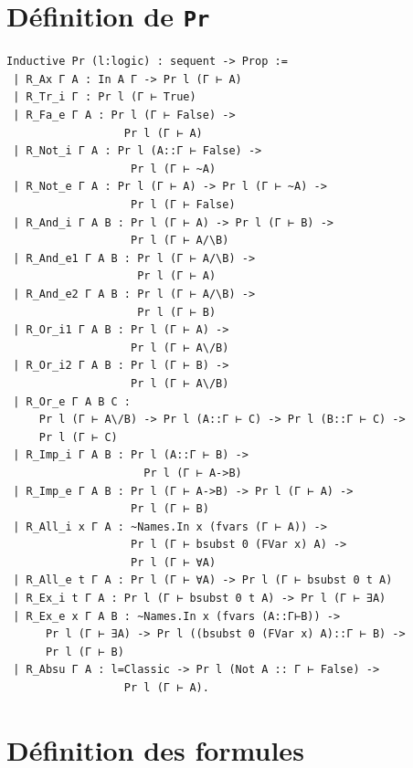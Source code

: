 \documentclass[a4paper]{article}
\theoremstyle{remark}
\theoremstyle{remark}
\theoremstyle{remark}
\theoremstyle{definition}
\theoremstyle{definition}
\theoremstyle{definition}
\begin{document}
\newpage



\nocite{*}


\appendix
\newpage



\section{Définition de \texttt{Pr}} \label{pr}

\begin{verbatim}
Inductive Pr (l:logic) : sequent -> Prop :=
 | R_Ax Γ A : In A Γ -> Pr l (Γ ⊢ A)
 | R_Tr_i Γ : Pr l (Γ ⊢ True)
 | R_Fa_e Γ A : Pr l (Γ ⊢ False) ->
                  Pr l (Γ ⊢ A)
 | R_Not_i Γ A : Pr l (A::Γ ⊢ False) ->
                   Pr l (Γ ⊢ ~A)
 | R_Not_e Γ A : Pr l (Γ ⊢ A) -> Pr l (Γ ⊢ ~A) ->
                   Pr l (Γ ⊢ False)
 | R_And_i Γ A B : Pr l (Γ ⊢ A) -> Pr l (Γ ⊢ B) ->
                   Pr l (Γ ⊢ A/\B)
 | R_And_e1 Γ A B : Pr l (Γ ⊢ A/\B) ->
                    Pr l (Γ ⊢ A)
 | R_And_e2 Γ A B : Pr l (Γ ⊢ A/\B) ->
                    Pr l (Γ ⊢ B)
 | R_Or_i1 Γ A B : Pr l (Γ ⊢ A) ->
                   Pr l (Γ ⊢ A\/B)
 | R_Or_i2 Γ A B : Pr l (Γ ⊢ B) ->
                   Pr l (Γ ⊢ A\/B)
 | R_Or_e Γ A B C :
     Pr l (Γ ⊢ A\/B) -> Pr l (A::Γ ⊢ C) -> Pr l (B::Γ ⊢ C) ->
     Pr l (Γ ⊢ C)
 | R_Imp_i Γ A B : Pr l (A::Γ ⊢ B) ->
                     Pr l (Γ ⊢ A->B)
 | R_Imp_e Γ A B : Pr l (Γ ⊢ A->B) -> Pr l (Γ ⊢ A) ->
                   Pr l (Γ ⊢ B)
 | R_All_i x Γ A : ~Names.In x (fvars (Γ ⊢ A)) ->
                   Pr l (Γ ⊢ bsubst 0 (FVar x) A) ->
                   Pr l (Γ ⊢ ∀A)
 | R_All_e t Γ A : Pr l (Γ ⊢ ∀A) -> Pr l (Γ ⊢ bsubst 0 t A)
 | R_Ex_i t Γ A : Pr l (Γ ⊢ bsubst 0 t A) -> Pr l (Γ ⊢ ∃A)
 | R_Ex_e x Γ A B : ~Names.In x (fvars (A::Γ⊢B)) ->
      Pr l (Γ ⊢ ∃A) -> Pr l ((bsubst 0 (FVar x) A)::Γ ⊢ B) ->
      Pr l (Γ ⊢ B)
 | R_Absu Γ A : l=Classic -> Pr l (Not A :: Γ ⊢ False) ->
                  Pr l (Γ ⊢ A).
\end{verbatim}

\section{Définition des formules} \label{form}
\end{document}

